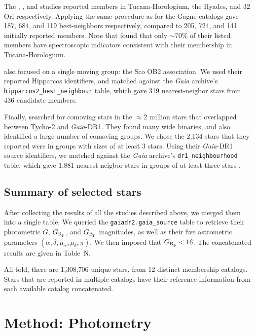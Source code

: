 \documentclass[12pt,twocolumn,tighten]{aastex62}
\begin{document}
The \citet{kraus_tucanahor_2014}, \citet{roser_deep_2011}, and
\citet{bell_32ori_2017} studies reported members in Tucana-Horologium,
the Hyades, and 32$\,$Ori respectively.  Applying the same procedure as
for the Gagne catalogs gave 187, 684, and 119 best-neighbors
respectively, compared to 205, 724, and 141 initially reported
members.  Note that \citet{kraus_tucanahor_2014} found that only
$\sim$70\% of their listed members have spectroscopic indicators
consistent with their membership in Tucana-Horologium.

\citet{rizzuto_multidimensional_2011} also focused on a single moving
group: the Sco OB2 association. We used their reported Hipparcos
identifiers, and matched against the {\it Gaia} archive's
\texttt{hipparcos2\_best\_neighbour} table, which gave 319
nearest-neigbor stars from 436 candidate members.

Finally, \citet{oh_comoving_2017} searched for comoving stars in the
$\approx$2 million stars that overlapped between Tycho-2 and {\it
Gaia}-DR1.  They found many wide binaries, and also identified a large
number of comoving groups.  We chose the 2{,}134 stars that they
reported were in groups with sizes of at least 3 stars.  Using their
{\it Gaia}-DR1 source identifiers, we matched against the {\it Gaia}
archive's \texttt{dr1\_neighbourhood} table, which gave 1{,}881
nearest-neigbor stars in groups of at least three stars
\citep{marrese_gaia_2019}.

\subsection{Summary of selected stars}

After collecting the results of all the studies described above, we
merged them into a single table. We queried the
\texttt{gaiadr2.gaia\_source} table to retrieve their photometric $G$,
$G_{\rm R_p}$, and $G_{\rm B_p}$ magnitudes, as well as their
five astrometric parameters $(\alpha, \delta, \mu_\alpha, \mu_\delta,
\pi)$.
We then imposed that $G_{\rm R_p} < 16$.
The concatenated results are given in Table~N.

All told, there are 1{,}308{,}706 unique stars, from 12 distinct
membership catalogs.
Stars that are reported in multiple catalogs have their reference
information from each available catalog concatenated.






\section{Method: Photometry}
\label{sec:method}
\end{document}
